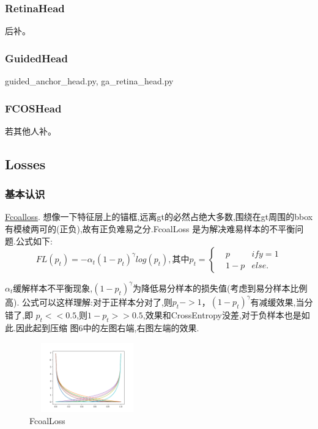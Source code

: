 \documentclass[UTF8]{ctexart}
\begin{document}
\subsubsection{RetinaHead}
后补。
\subsubsection{GuidedHead}
guided\_anchor\_head.py, ga\_retina\_head.py

\subsubsection{FCOSHead}
若其他人补。

\subsection{Losses}
\label{sec:loss}
\subsubsection{基本认识}

\href{https://arxiv.org/abs/1708.02002}{Fcoalloss}.
想像一下特征层上的锚框,远离gt的必然占绝大多数,围绕在gt周围的bbox有模棱两可的(正负),故有正负难易之分.FcoalLoss 是为解决难易样本的不平衡问题.公式如下:
\begin{equation}
	FL(p_t) = -\alpha_{t}(1-p_t)^{\gamma}log(p_t),\text{其中}
	p_t=\left\{
	\begin{aligned}
	&p & if y =1\\
	&1-p & else.
	\end{aligned}
	\right.
\end{equation}

$\alpha_t$缓解样本不平衡现象,$(1-p_t)^{\gamma}$为降低易分样本的损失值(考虑到易分样本比例高).
公式可以这样理解:对于正样本分对了,则$p_t->1$，$(1-p_t)^{\gamma}$有减缓效果,当分错了,即
$p_t << 0.5$,则$1-p_t >>0.5$,效果和CrossEntropy没差,对于负样本也是如此.因此起到压缩
图6中的左图右端,右图左端的效果.

\begin{figure}[htbp]
	\centering
	\includegraphics[width=5cm,height=3cm]{./pic/Focal_01.png}
	\caption{FcoalLoss}
\end{figure}
\end{document}

